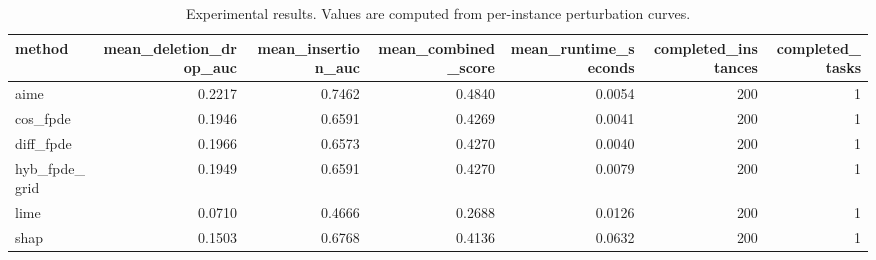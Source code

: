 \begin{table}[t]
\caption{Experimental results. Values are computed from per-instance perturbation curves.}
\label{tab:main_results_computed}
\centering
\begin{tabular}{lrrrrrr}
\toprule
method & mean\_deletion\_drop\_auc & mean\_insertion\_auc & mean\_combined\_score & mean\_runtime\_seconds & completed\_instances & completed\_tasks \\
\midrule
aime & 0.2217 & 0.7462 & 0.4840 & 0.0054 & 200 & 1 \\
cos\_fpde & 0.1946 & 0.6591 & 0.4269 & 0.0041 & 200 & 1 \\
diff\_fpde & 0.1966 & 0.6573 & 0.4270 & 0.0040 & 200 & 1 \\
hyb\_fpde\_grid & 0.1949 & 0.6591 & 0.4270 & 0.0079 & 200 & 1 \\
lime & 0.0710 & 0.4666 & 0.2688 & 0.0126 & 200 & 1 \\
shap & 0.1503 & 0.6768 & 0.4136 & 0.0632 & 200 & 1 \\
\bottomrule
\end{tabular}

\end{table}
